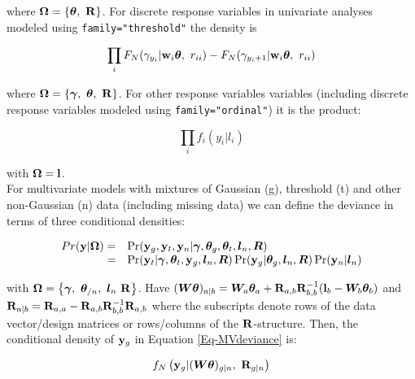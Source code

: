 \documentclass{article}
\begin{document}
where ${\bm \Omega} = \left\{{\bm \theta},\ {\bf R}\right\}$.  For discrete response variables in univariate analyses modeled using \texttt{family="threshold"} the density is

\begin{equation}
\prod_{i} F_{N}(\gamma_{y_{i}} | {\bf w}_{i}{\bm \theta}, \ r_{ii})-F_{N}(\gamma_{y_{i}+1} | {\bf w}_{i}{\bm \theta}, \ r_{ii})
\end{equation}

where ${\bm \Omega} = \left\{{\bm \gamma},\ {\bm \theta},\ {\bf R}\right\}$. For other response variables variables (including discrete response variables modeled using \texttt{family="ordinal"}) it is the product:

\begin{equation}
\prod_{i}f_{i}(y_{i} | l_{i})
\label{LLikL}
\end{equation}

with ${\bm \Omega} = {\bf l}$.\\

For multivariate models with mixtures of Gaussian (g), threshold (t) and other non-Gaussian (n) data (including missing data) we can define the deviance in terms of three conditional densities:  

\begin{equation}
\begin{array}{rl}
Pr({\bf y} | {\bm \Omega}) =& \Pr({\bf y}_{g}, {\bf y}_{t}, {\bf y}_{n} | {\bm \gamma}, {\bm \theta}_{g}, {\bm \theta}_{t}, {\bm l}_{n}, {\bm R})\\
                           =& \Pr({\bf y}_{t} | {\bm \gamma}, {\bm \theta}_{t}, {\bf y}_{g}, {\bm l}_{n}, {\bm R})\Pr({\bf y}_{g} | {\bm \theta}_{g}, {\bm l}_{n}, {\bm R})\Pr({\bf y}_{n} | {\bm l}_{n})\\
\label{Eq-MVdeviance}
\end{array}
\end{equation}

with ${\bm \Omega} = \left\{{\bm \gamma},\ {\bm \theta}_{/n},\ {\bm l}_{n}\ {\bf R}\right\}$.  Have $({\bm W}{\bm \theta})_{a|b}={\bm W}_{a}{\bm \theta}_{a}+{\bf R}_{a,b}{\bf R}^{-1}_{b,b}({\bf l}_{b}-{\bm W}_{b}{\bm \theta}_{b})$ and ${\bf R}_{a |b} = {\bf R}_{a,a}-{\bf R}_{a,b}{\bf R}^{-1}_{b,b}{\bf R}_{a,b}$ where the subscripts denote rows of the data vector/design matrices or rows/columns of the ${\bf R}$-structure.
Then, the conditional density of ${\bf y}_{g}$ in Equation \ref{Eq-MVdeviance} is:

\begin{equation}
f_{N}\left({\bf y}_{g} | ({\bm W}{\bm \theta})_{g|n},\ {\bf R}_{g|n}\right) 
\end{equation}
\end{document}

